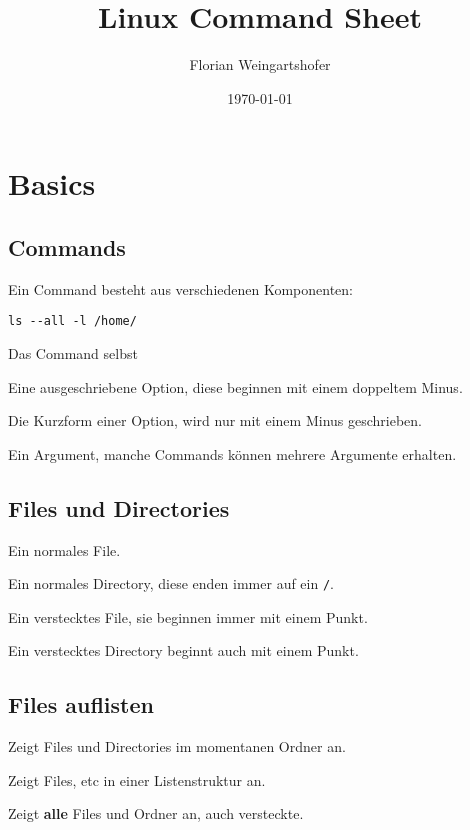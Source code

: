 \documentclass{article}
\title{Linux Command Sheet}
\author{Florian Weingartshofer}
\date{\today}
\begin{document}
\maketitle
\tableofcontents{}
\newpage
\section{Basics}
\subsection{Commands}
Ein Command besteht aus verschiedenen Komponenten:

\begin{verbatim}
ls --all -l /home/
\end{verbatim}

 Das Command selbst

Eine ausgeschriebene Option, diese beginnen mit einem doppeltem Minus.

Die Kurzform einer Option, wird nur mit einem Minus geschrieben.

Ein Argument, manche Commands können mehrere Argumente erhalten.

\subsection{Files und Directories}
Ein normales File.

Ein normales Directory, diese enden immer auf ein \texttt{/}.

Ein verstecktes File, sie beginnen immer mit einem Punkt.

Ein verstecktes Directory beginnt auch mit einem Punkt.

\subsection{Files auflisten}
Zeigt Files und Directories im momentanen Ordner an.

Zeigt Files, etc in einer Listenstruktur an.

Zeigt \textbf{alle} Files und Ordner an, auch versteckte.
\end{document}
